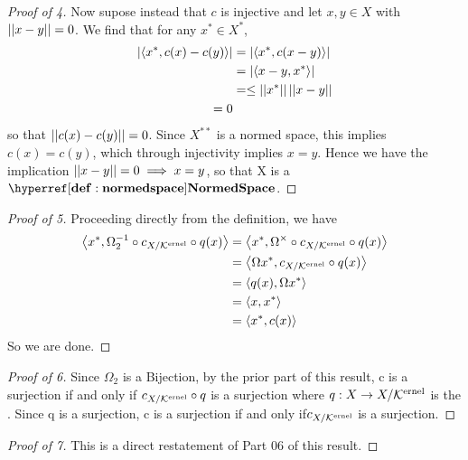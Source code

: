 \begin{prop}
\begin{proof}[Proof of 4]
	Now supose instead that $c$ is injective
	and let $x,y \in X$ with $\left|\left| x-y \right|\right| = 0$.
	We find that for any $x^* \in X^*$, 
	\begin{align*}
	\left| \left\langle x^*, c(x)-c(y) \right\rangle \right| & = \left| \left\langle x^*, c(x-y) \right\rangle \right| \\
	& = \left| \left\langle x-y, x^* \right\rangle \right|\\
	& =	\leq \left|\left| x^* \right|\right| \left|\left| x-y \right|\right| \\
	= 0
	\end{align*}
	so that $\left|\left| c(x)-c(y) \right|\right| = 0$.
	Since $X^{**}$ is a normed space, 
	this implies $c(x) = c(y)$, which through injectivity 
	implies $x=y$. 
	Hence we have the implication $\left|\left| x-y \right|\right| = 0 \implies x=y$, so
	that X is a $\NormedSpace$. 
    \end{proof}
    \begin{proof}[Proof of 5]
	Proceeding directly from the definition, we have 
	\begin{align*}
	\left\langle x^*, \Omega_2^{-1} \circ c_{X/\bf\mathcal{K}\rm^{ernel}} \circ q (x)  \right\rangle & = \left\langle x^*, \Omega^{\times} \circ c_{X/\bf\mathcal{K}\rm^{ernel}} \circ q(x) \right\rangle\\
	& = \left\langle \Omega x^*, c_{X/\bf\mathcal{K}\rm^{ernel}} \circ q(x)  \right\rangle \\
	& = \left\langle q(x), \Omega x^* \right\rangle \\
	& = \left\langle x, x^*  \right\rangle\\
	& = \left\langle x^*, c(x) \right\rangle
	\end{align*}
	So we are done.
    \end{proof}
	\begin{proof}[Proof of 6]
	Since $\Omega_2$ is a Bijection, 
	by the prior part of this result, 
	c is a surjection if and only if
	$c_{X/\bf\mathcal{K}\rm^{ernel}} \circ q$ is a surjection
	where $q:X \to X/\bf\mathcal{K}\rm^{ernel}$ is the \QuotientMap. 
	Since q is a surjection, 
	c is a surjection 
	if and only if$c_{X/\bf\mathcal{K}\rm^{ernel}}$ 
	is a surjection. 
	\end{proof} 
	\begin{proof}[Proof of 7]
	This is a direct restatement of Part 06 of this result. 
	\end{proof} 
\end{prop}

